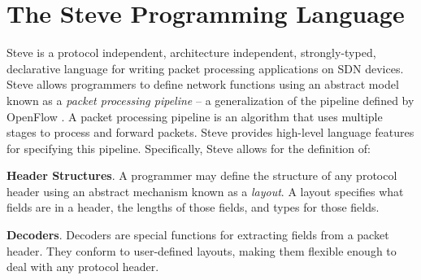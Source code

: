 %
%

\section{The Steve Programming Language}

Steve is a protocol independent, architecture independent, strongly-typed,
declarative language for writing packet processing applications on SDN devices.
Steve allows programmers to define network functions using an abstract model
known as a \emph{packet processing pipeline} -- a generalization
of the pipeline defined by OpenFlow \cite{openflow_spec}.
A packet processing pipeline is an algorithm that
uses multiple stages to process and forward packets.
Steve provides high-level language features for specifying this pipeline.
Specifically, Steve allows for the definition of:

\textbf{Header Structures}.
A programmer may define the structure of any protocol header using an abstract
mechanism known as a \emph{layout}.
A layout specifies what fields are in a header, the lengths of those fields,
and types for those fields.

\textbf{Decoders}. Decoders are special functions for extracting fields from a
packet header. They conform to user-defined layouts, making them flexible enough
to deal with any protocol header.

%


